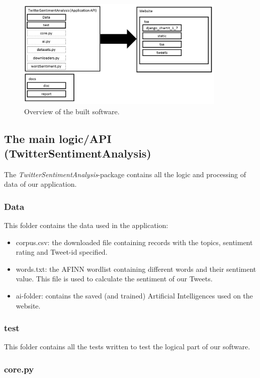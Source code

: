 \documentclass[10pt]{IEEEtran}
\begin{document}
\begin{figure}[H]
\begin{center}
\includegraphics[width=10cm]{images/software}
\caption{Overview of the built software. \label{software1}}
\end{center}
\end{figure}

\subsection{The main logic/API (TwitterSentimentAnalysis)}

The \emph{TwitterSentimentAnalysis}-package contains all the logic and processing of data of our application.

\subsubsection{Data}

This folder contains the data used in the application: 
\begin{itemize}
	\item corpus.csv: the downloaded file containing records with the topics, sentiment rating and Tweet-id specified.
	\item words.txt: the AFINN wordlist containing different words and their sentiment value. This file is used to calculate the sentiment of our Tweets.
	\item ai-folder: contains the saved (and trained) Artificial Intelligences used on the website.
\end{itemize}

\subsubsection{test}

This folder contains all the tests written to test the logical part of our software.

\subsubsection{core.py}
\end{document}
